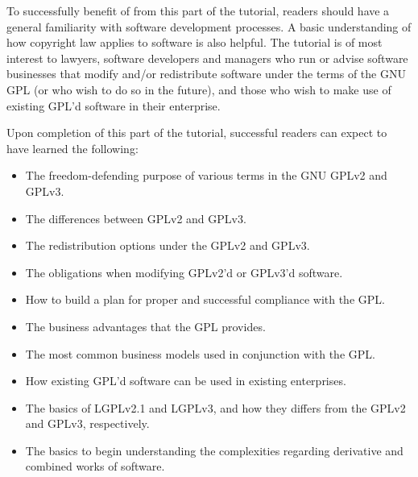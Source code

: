 To successfully benefit of from this part of the tutorial, readers should
have a general familiarity with software development processes.  A basic
understanding of how copyright law applies to software is also helpful.  The
tutorial is of most interest to lawyers, software developers and managers who
run or advise software businesses that modify and/or redistribute software
under the terms of the GNU GPL (or who wish to do so in the future), and those
who wish to make use of existing GPL'd software in their enterprise.

Upon completion of this part of the tutorial, successful readers can expect
to have learned the following:

\begin{itemize}

  \item The freedom-defending purpose of various terms in the GNU GPLv2 and GPLv3.

  \item The differences between GPLv2 and GPLv3.

  \item The redistribution options under the GPLv2 and GPLv3.

  \item The obligations when modifying GPLv2'd or GPLv3'd software.

  \item How to build a plan for proper and successful compliance with the GPL.

  \item The business advantages that the GPL provides.

  \item The most common business models used in conjunction with the GPL.

  \item How existing GPL'd software can be used in existing enterprises.

  \item The basics of LGPLv2.1 and LGPLv3, and how they
    differs from the GPLv2 and GPLv3, respectively.

  \item The basics to begin understanding the complexities regarding
    derivative and combined works of software.
\end{itemize}


